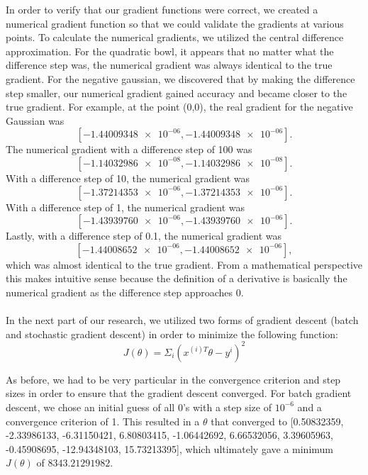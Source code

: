 \documentclass{article}
\begin{document}
In order to verify that our gradient functions were correct, we created a numerical gradient function so that we could validate the gradients at various points. To calculate the numerical gradients, we utilized the central difference approximation. For the quadratic bowl, it appears that no matter what the difference step was, the numerical gradient was always identical to the true gradient. For the negative gaussian, we discovered that by making the difference step smaller, our numerical gradient gained accuracy and became closer to the true gradient. For example, at the point (0,0), the real gradient for the negative Gaussian was $$[ \num{-1.44009348e-06}, \num{-1.44009348e-06}].$$
The numerical gradient with a difference step of 100 was $$[ \num{-1.14032986e-08} , \num{-1.14032986e-08}].$$
With a difference step of 10, the numerical gradient was $$[ \num{-1.37214353e-06},  \num{-1.37214353e-06}].$$
With a difference step of 1, the numerical gradient was $$[ \num{-1.43939760e-06},  \num{-1.43939760e-06}].$$
Lastly, with a difference step of 0.1, the numerical gradient was
$$[ \num{-1.44008652e-06}, \num{-1.44008652e-06}],$$ which was almost identical to the true gradient. From a mathematical perspective this makes intuitive sense because the definition of a derivative is basically the numerical gradient as the difference step approaches 0. \\ \\

In the next part of our research, we utilized two forms of gradient descent (batch and stochastic gradient descent) in order to minimize the following function: \\
$$J(\theta) = \Sigma_{i}(x^{(i)T}\theta - y^{i})^2$$

As before, we had to be very particular in the convergence criterion and step sizes in order to ensure that the gradient descent converged. For batch gradient descent, we chose an initial guess of all $0$'s with a step size of $10^{-6}$ and a convergence criterion of 1. This resulted in a $\theta$ that converged to [0.50832359, -2.33986133, -6.31150421, 6.80803415, -1.06442692, 6.66532056, 3.39605963, -0.45908695, -12.94348103, 15.73213395], which ultimately gave a minimum $J(\theta)$ of $8343.21291982$. \\ \\
\end{document}
